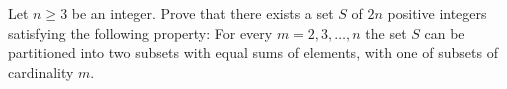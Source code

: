 Let $n \geq 3$ be an integer. Prove that there exists a set $S$ of $2n$ positive integers satisfying the following property: For every $m = 2, 3, \ldots, n$ the set $S$ can be partitioned into two subsets with equal sums of elements, with one of subsets of cardinality $m$.
